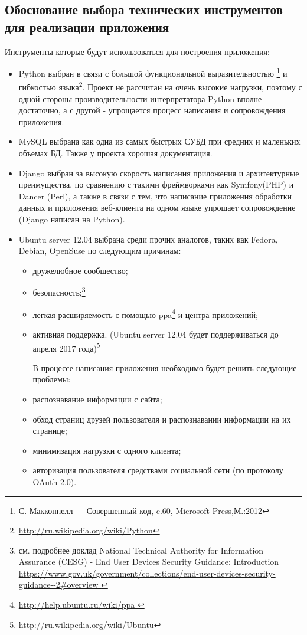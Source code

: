 \begin{itemize}
\section{Обоснование выбора технических инструментов для реализации приложения}
Инструменты которые будут использоваться для построения приложения:
\begin{itemize}
\item Python выбран в связи с большой функциональной выразительностью
\footnote{С. Макконнелл — Совершенный код, c.60, Microsoft Press,М.:2012} 
и гибкостью языка\footnote{\url{http://ru.wikipedia.org/wiki/Python}}. Проект не рассчитан на очень высокие нагрузки, поэтому с одной стороны производительности интерпретатора Python вполне достаточно, а с другой - упрощается процесс написания и сопровождения приложения. \\
\item MySQL выбрана как одна из самых быстрых СУБД при средних и маленьких объемах БД. Также у проекта хорошая документация.\\
\item Django выбран за высокую скорость написания приложения и архитектурные преимущества, по сравнению с такими фреймворками как Symfony(PHP) и Dancer (Perl), а также в связи с тем, что написание приложения обработки данных и приложения веб-клиента на одном языке упрощает сопровождение (Django написан на Python).\\
\item Ubuntu server 12.04 выбрана среди прочих аналогов, таких как Fedora, Debian, OpenSuse по следующим причинам:\\
	\begin{itemize}
	\item дружелюбное сообщество;
	\item безопасность;\footnote{см. подробнее доклад National Technical Authority for Information Assurance (CESG) - End User Devices Security Guidance: Introduction   \url{https://www.gov.uk/government/collections/end-user-devices-security-guidance--2\#overview }}
	\item легкая расширяемость с помощью ppa\footnote{\url{http://help.ubuntu.ru/wiki/ppa }}
	 и центра приложений;
	\item активная поддержка. (Ubuntu server 12.04 будет поддерживаться до апреля 2017 года)\footnote{\url{http://ru.wikipedia.org/wiki/Ubuntu}}
	
	В процессе написания приложения необходимо будет решить следующие проблемы:
	\item распознавание информации с сайта;
	\item обход страниц друзей пользователя и распознавании информации на их странице;
	\item минимизация нагрузки с одного клиента;
	\item авторизация пользователя средствами социальной сети (по протоколу OAuth 2.0).
	

\end{itemize}
\end{itemize}
\end{itemize}
